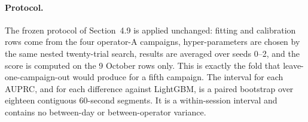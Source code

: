 \begin{table}[htbp]
\centering
\caption{The second-operator capture against the four development campaigns.}
\label{tab:5_17}
\vspace{0.4em}
\singlespacing
\footnotesize
{}
\end{table}

\paragraph{Protocol.} The frozen protocol of Section~4.9 is applied unchanged: fitting and calibration rows come from the four operator-A campaigns, hyper-parameters are chosen by the same nested twenty-trial search, results are averaged over seeds 0--2, and the score is computed on the 9 October rows only. This is exactly the fold that leave-one-campaign-out would produce for a fifth campaign. The interval for each AUPRC, and for each difference against LightGBM, is a paired bootstrap over eighteen contiguous 60-second segments. It is a within-session interval and contains no between-day or between-operator variance.

